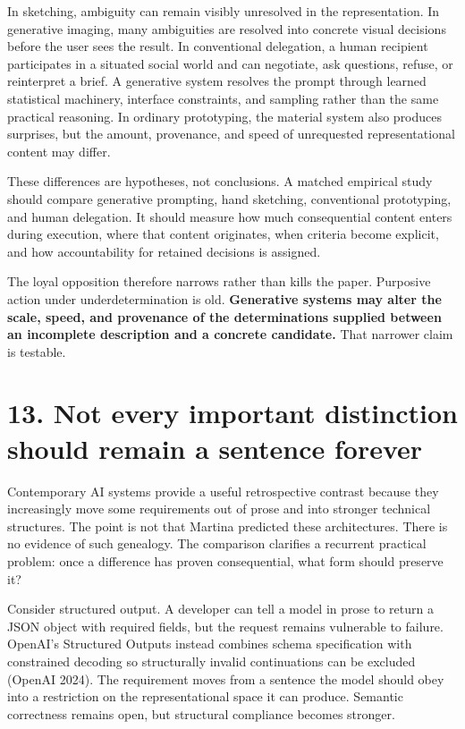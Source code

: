 \documentclass[
  11pt,
  letterpaper,
]{article}
\begin{document}
In sketching, ambiguity can remain visibly unresolved in the
representation. In generative imaging, many ambiguities are resolved
into concrete visual decisions before the user sees the result. In
conventional delegation, a human recipient participates in a situated
social world and can negotiate, ask questions, refuse, or reinterpret a
brief. A generative system resolves the prompt through learned
statistical machinery, interface constraints, and sampling rather than
the same practical reasoning. In ordinary prototyping, the material
system also produces surprises, but the amount, provenance, and speed of
unrequested representational content may differ.

These differences are hypotheses, not conclusions. A matched empirical
study should compare generative prompting, hand sketching, conventional
prototyping, and human delegation. It should measure how much
consequential content enters during execution, where that content
originates, when criteria become explicit, and how accountability for
retained decisions is assigned.

The loyal opposition therefore narrows rather than kills the paper.
Purposive action under underdetermination is old. \textbf{Generative
systems may alter the scale, speed, and provenance of the determinations
supplied between an incomplete description and a concrete candidate.}
That narrower claim is testable.

\section{13. Not every important distinction should remain a sentence
forever}\label{not-every-important-distinction-should-remain-a-sentence-forever}

Contemporary AI systems provide a useful retrospective contrast because
they increasingly move some requirements out of prose and into stronger
technical structures. The point is not that Martina predicted these
architectures. There is no evidence of such genealogy. The comparison
clarifies a recurrent practical problem: once a difference has proven
consequential, what form should preserve it?

Consider structured output. A developer can tell a model in prose to
return a JSON object with required fields, but the request remains
vulnerable to failure. OpenAI's Structured Outputs instead combines
schema specification with constrained decoding so structurally invalid
continuations can be excluded (OpenAI 2024). The requirement moves from
a sentence the model should obey into a restriction on the
representational space it can produce. Semantic correctness remains
open, but structural compliance becomes stronger.
\end{document}
